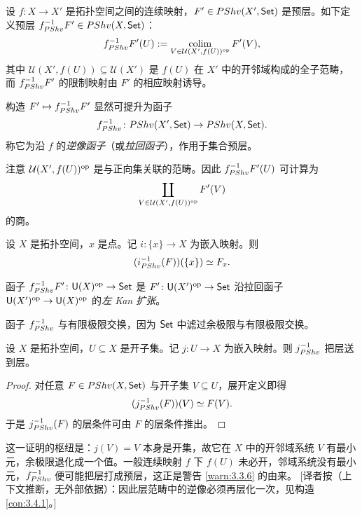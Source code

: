 \begin{construction}\label{con:3.3.1}
设 $f\colon X\to X'$ 是拓扑空间之间的连续映射，$F'\in PShv(X',\mathsf{Set})$ 是预层。如下定义预层 $f_{PShv}^{-1}F'\in PShv(X,\mathsf{Set})$：
\[
f_{PShv}^{-1}F'(U):=\operatorname*{colim}_{V\in\mathcal U(X',f(U))^{\mathrm{op}}}F'(V),
\]
其中 $\mathcal U(X',f(U))\subseteq\mathcal U(X')$ 是 $f(U)$ 在 $X'$ 中的开邻域构成的全子范畴，而 $f_{PShv}^{-1}F'$ 的限制映射由 $F'$ 的相应映射诱导。

构造 $F'\mapsto f_{PShv}^{-1}F'$ 显然可提升为函子
\[
f_{PShv}^{-1}\colon PShv(X',\mathsf{Set})\to PShv(X,\mathsf{Set}).
\]
称它为沿 $f$ 的\emph{逆像函子}（或\emph{拉回函子}），作用于集合预层。

注意 $\mathcal U(X',f(U))^{\mathrm{op}}$ 是与正向集关联的范畴。因此 $f_{PShv}^{-1}F'(U)$ 可计算为
\[
\coprod_{V\in\mathcal U(X',f(U))^{\mathrm{op}}}F'(V)
\]
的商。
\end{construction}

\begin{example}\label{ex:3.3.2}
设 $X$ 是拓扑空间，$x$ 是点。记 $i\colon\{x\}\to X$ 为嵌入映射。则
\[
(i_{PShv}^{-1}(F))(\{x\})\simeq F_x.
\]
\end{example}

\begin{remark}\label{rem:3.3.3}
函子 $f_{PShv}^{-1}F'\colon\mathsf{U}(X)^{\mathrm{op}}\to\mathsf{Set}$ 是 $F'\colon\mathsf{U}(X')^{\mathrm{op}}\to\mathsf{Set}$ 沿拉回函子 $\mathsf{U}(X')^{\mathrm{op}}\to\mathsf{U}(X)^{\mathrm{op}}$ 的\emph{左 Kan 扩张}。
\end{remark}

\begin{remark}\label{rem:3.3.4}
函子 $f_{PShv}^{-1}$ 与有限极限交换，因为 $\mathsf{Set}$ 中滤过余极限与有限极限交换。
\end{remark}

\begin{lemma}\label{lem:3.3.5}
设 $X$ 是拓扑空间，$U\subseteq X$ 是开子集。记 $j\colon U\to X$ 为嵌入映射。则 $j_{PShv}^{-1}$ 把层送到层。
\end{lemma}

\begin{proof}
对任意 $F\in PShv(X,\mathsf{Set})$ 与开子集 $V\subseteq U$，展开定义即得
\[
(j_{PShv}^{-1}(F))(V)\simeq F(V).
\]
于是 $j_{PShv}^{-1}(F)$ 的层条件可由 $F$ 的层条件推出。
\end{proof}

\begin{yizhu}
这一证明的枢纽是：$j(V)=V$ 本身是开集，故它在 $X$ 中的开邻域系统 $V$ 有最小元，余极限退化成一个值。一般连续映射 $f$ 下 $f(U)$ 未必开，邻域系统没有最小元，$f_{PShv}^{-1}$ 便可能把层打成预层，这正是警告 \ref{warn:3.3.6} 的由来。
[译者按（上下文推断，无外部依据）：因此层范畴中的逆像必须再层化一次，见构造 \ref{con:3.4.1}。]
\end{yizhu}

